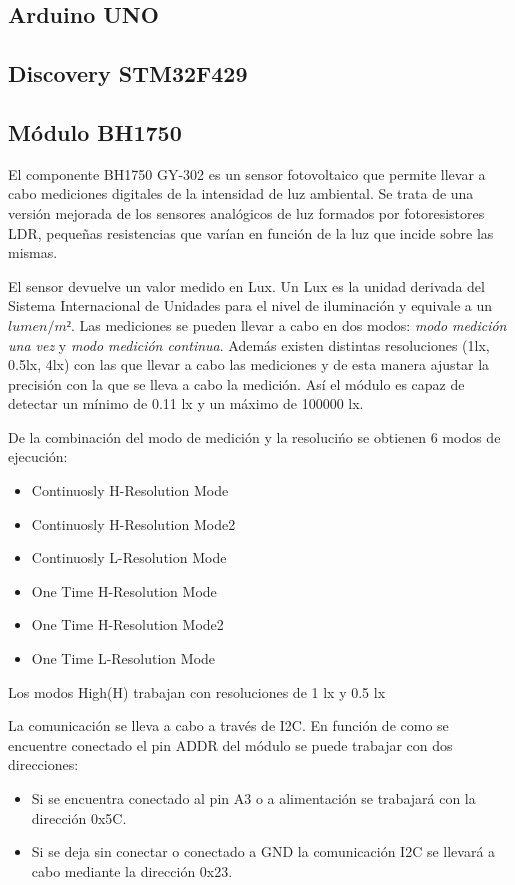 \subsection{Arduino UNO}\label{subsec:arduino}

\subsection{Discovery STM32F429}\label{subsec:discovery}

\subsection{M\'odulo BH1750}\label{subsec:bh1750}
El componente BH1750 GY-302 es un sensor fotovoltaico que permite
llevar a cabo mediciones digitales de la intensidad de luz
ambiental. Se trata de una versi\'on mejorada de los sensores
anal\'ogicos de luz formados por fotoresistores LDR, peque\~nas resistencias que
var\'ian en funci\'on de la luz que incide sobre las mismas.

El sensor devuelve un valor medido en Lux. Un Lux es la unidad
derivada del Sistema Internacional de Unidades para el nivel de
iluminaci\'on y equivale a un $lumen/m²$. Las mediciones se pueden
llevar a cabo en dos modos: \emph{modo medici\'on una vez} y \emph{modo
  medici\'on continua}. Adem\'as existen distintas resoluciones (1lx,
0.5lx, 4lx) con
las que llevar a cabo las mediciones y de esta manera ajustar la
precisi\'on con la que se lleva a cabo la medici\'on. As\'i el m\'odulo es capaz de detectar un
m\'inimo de 0.11 lx y un m\'aximo de 100000 lx. 

De la combinaci\'on del modo de medici\'on y la resoluci\'no se
obtienen 6 modos de ejecuci\'on:
\begin{itemize}
\item Continuosly H-Resolution Mode
\item Continuosly H-Resolution Mode2
\item Continuosly L-Resolution Mode
\item One Time H-Resolution Mode
\item One Time H-Resolution Mode2
\item One Time L-Resolution Mode
\end{itemize}

Los modos High(H) trabajan con resoluciones de 1 lx y 0.5 lx 

La comunicaci\'on se lleva a cabo a través de I2C. En funci\'on de
como se encuentre conectado el pin ADDR del m\'odulo se puede trabajar
con dos direcciones:
\begin{itemize}
\item Si se encuentra conectado al pin A3 o a alimentaci\'on se
  trabajar\'a con la direcci\'on 0x5C.
\item Si se deja sin conectar o conectado a GND la comunicaci\'on I2C
  se llevar\'a a cabo mediante la direcci\'on 0x23.
\end{itemize}

